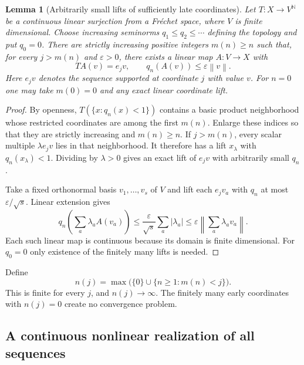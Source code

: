 \documentclass[11pt,a4paper]{article}
\numberwithin{equation}{section}
\newtheorem{lemma}[theorem]{Lemma}
\theoremstyle{definition}
\theoremstyle{remark}
\newcommand{\N}{\mathbb N}
\newcommand{\norm}[1]{\left\lVert#1\right\rVert}
\begin{document}
\begin{lemma}[Arbitrarily small lifts of sufficiently late coordinates]
\label{lem:small-lifts}
Let $T:X\to V^\N$ be a continuous linear surjection from a Fr\'echet space,
where $V$ is finite dimensional. Choose increasing seminorms
$q_1\le q_2\le\cdots$ defining the topology and put $q_0=0$. There are
strictly increasing positive integers $m(n)\ge n$ such that, for every
$j>m(n)$ and $\varepsilon>0$, there exists a linear map $A:V\to X$ with
\begin{equation}\label{eq:small-lift}
 TA(v)=e_jv,\qquad q_n(A(v))\le\varepsilon\norm v.
\end{equation}
Here $e_jv$ denotes the sequence supported at coordinate $j$ with value $v$.
For $n=0$ one may take $m(0)=0$ and any exact linear coordinate lift.
\end{lemma}
\begin{proof}
By openness, $T(\{x:q_n(x)<1\})$ contains a basic product neighborhood whose
restricted coordinates are among the first $m(n)$. Enlarge these indices so
that they are strictly increasing and $m(n)\ge n$. If $j>m(n)$, every scalar
multiple $\lambda e_jv$ lies in that neighborhood. It therefore has a lift
$x_\lambda$ with $q_n(x_\lambda)<1$. Dividing by $\lambda>0$ gives an exact
lift of $e_jv$ with arbitrarily small $q_n$.

Take a fixed orthonormal basis $v_1,\ldots,v_s$ of $V$ and lift each $e_jv_a$
with $q_n$ at most $\varepsilon/\sqrt{s}$. Linear extension gives
\[
 q_n\!\left(\sum_a\lambda_a A(v_a)\right)
 \le \frac{\varepsilon}{\sqrt{s}}\sum_a|\lambda_a|
 \le\varepsilon\norm{\sum_a\lambda_av_a}.
\]
Each such linear map is continuous because its domain is finite dimensional.
For $q_0=0$ only existence of the finitely many lifts is needed.
\end{proof}

Define
\begin{equation}\label{eq:nj}
 n(j)=\max\bigl(\{0\}\cup\{n\ge1:m(n)<j\}\bigr).
\end{equation}
This is finite for every $j$, and $n(j)\to\infty$. The finitely many early
coordinates with $n(j)=0$ create no convergence problem.

\subsection{A continuous nonlinear realization of all sequences}
\end{document}
